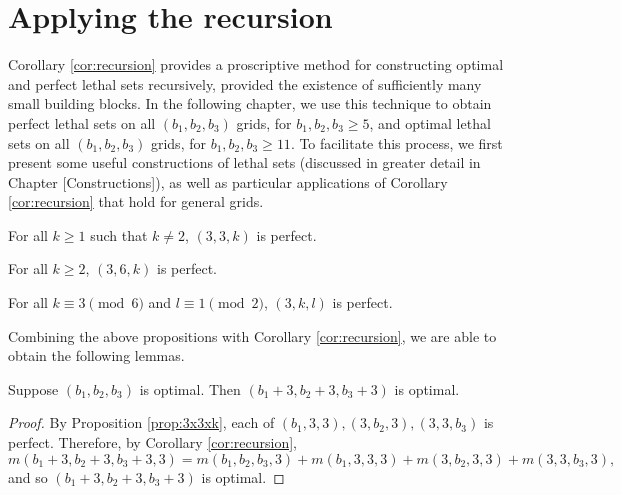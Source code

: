\section{Applying the recursion}

Corollary \ref{cor:recursion} provides a proscriptive method for constructing optimal and perfect lethal sets recursively, provided the existence of sufficiently many small building blocks. In the following chapter, we use this technique to obtain perfect lethal sets on all $(b_1,b_2,b_3)$ grids, for $b_1,b_2,b_3 \geq 5$, and optimal lethal sets on all $(b_1,b_2,b_3)$ grids, for $b_1,b_2,b_3 \geq 11$. To facilitate this process, we first present some useful constructions of lethal sets (discussed in greater detail in Chapter [Constructions]), as well as particular applications of Corollary \ref{cor:recursion} that hold for general grids. 

\begin{prop}
\label{prop:3x3xk}
For all $k \geq 1$ such that $k \neq 2$, $(3,3,k)$ is perfect.
\end{prop}

\begin{prop}
For all $k \geq 2$, $(3,6,k)$ is perfect.
\end{prop}

\begin{prop}
For all $k \equiv 3 \pmod 6$ and $l \equiv 1 \pmod 2$, $(3,k,l)$ is perfect.
\end{prop}

Combining the above propositions with Corollary \ref{cor:recursion}, we are able to obtain the following lemmas.

\begin{lem}
Suppose $(b_1, b_2, b_3)$ is optimal. Then $(b_1+3, b_2+3, b_3+3)$ is optimal. 
\end{lem}

\begin{proof}
By Proposition \ref{prop:3x3xk}, each of $(b_1,3,3), (3,b_2,3),(3,3,b_3)$ is perfect. Therefore, by Corollary \ref{cor:recursion}, 
$$m(b_1+3, b_2+3, b_3+3, 3) = m(b_1,b_2,b_3,3) + m(b_1,3,3,3) + m(3,b_2,3,3) + m(3,3,b_3,3),$$
and so $(b_1+3, b_2+3, b_3+3)$ is optimal.
\end{proof}


